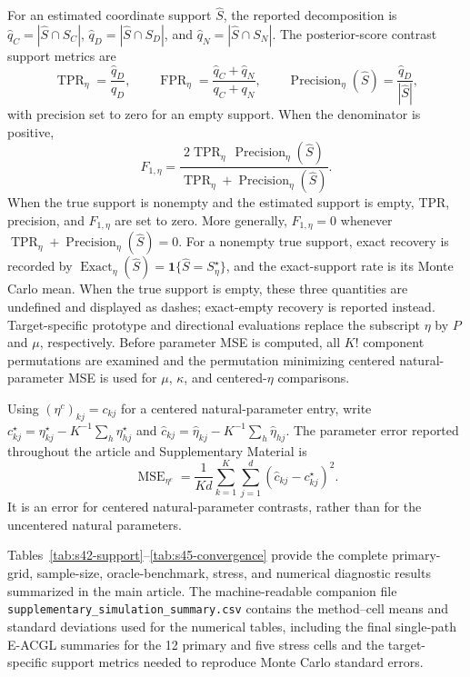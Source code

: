 \documentclass[preprint,12pt,authoryear]{elsarticle}
\begin{document}
For an estimated coordinate support $\widehat S$, the reported decomposition
is $\widehat q_C=|\widehat S\cap S_C|$,
$\widehat q_D=|\widehat S\cap S_D|$, and
$\widehat q_N=|\widehat S\cap S_N|$. The posterior-score contrast support
metrics are
\[
\operatorname{TPR}_\eta=\frac{\widehat q_D}{q_D},\qquad
\operatorname{FPR}_\eta=\frac{\widehat q_C+\widehat q_N}{q_C+q_N},\qquad
\operatorname{Precision}_\eta(\widehat S)
=\frac{\widehat q_D}{|\widehat S|},
\]
with precision set to zero for an empty support. When the denominator is
positive,
\[
F_{1,\eta}
=\frac{2\operatorname{TPR}_\eta\,
\operatorname{Precision}_\eta(\widehat S)}
{\operatorname{TPR}_\eta+\operatorname{Precision}_\eta(\widehat S)}.
\]
When the true support is nonempty and the estimated support is empty, TPR,
precision, and $F_{1,\eta}$ are set to zero. More generally, $F_{1,\eta}=0$
whenever
$\operatorname{TPR}_\eta+\operatorname{Precision}_\eta(\widehat S)=0$.
For a nonempty true support, exact recovery is recorded by
$\operatorname{Exact}_\eta(\widehat S)
=\mathbf 1\{\widehat S=S_\eta^\star\}$, and the exact-support rate is its
Monte Carlo mean. When the true support is empty, these
three quantities are undefined and displayed as dashes; exact-empty recovery
is reported instead. Target-specific prototype and directional evaluations
replace the subscript $\eta$ by $P$ and $\mu$, respectively.
Before parameter MSE is computed, all $K!$ component permutations
are examined and the permutation minimizing centered natural-parameter MSE is
used for $\mu$, $\kappa$, and centered-$\eta$ comparisons.

Using $(\eta^c)_{kj}=c_{kj}$ for a centered natural-parameter entry, write
$c_{kj}^{\star}=\eta_{kj}^{\star}
-K^{-1}\sum_h\eta_{hj}^{\star}$ and
$\widehat c_{kj}=\widehat\eta_{kj}
-K^{-1}\sum_h\widehat\eta_{hj}$. The parameter error reported throughout
the article and Supplementary Material is
\[
\operatorname{MSE}_{\eta^c}
=\frac{1}{Kd}\sum_{k=1}^K\sum_{j=1}^d
(\widehat c_{kj}-c_{kj}^{\star})^2.
\]
It is an error for centered natural-parameter contrasts, rather than for the
uncentered natural parameters.

Tables~\ref{tab:s42-support}--\ref{tab:s45-convergence} provide the
complete primary-grid, sample-size, oracle-benchmark, stress, and numerical
diagnostic results summarized in the main article.
The machine-readable companion file
\nolinkurl{supplementary_simulation_summary.csv} contains the method--cell
means and standard deviations used for the numerical tables, including the
final single-path E-ACGL summaries for the 12 primary and five stress cells and
the target-specific support metrics needed to reproduce Monte Carlo standard
errors.
\end{document}
